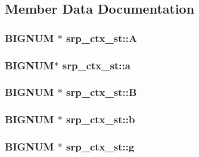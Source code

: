\subsection{Member Data Documentation}
\hypertarget{structsrp__ctx__st_a65bcccab6ee5eb609c2304fd3a2a7c3f}{
\subsubsection[{A}]{\setlength{\rightskip}{0pt plus 5cm}B\-I\-G\-N\-U\-M $\ast$ srp\-\_\-ctx\-\_\-st\-::\-A}}\label{structsrp__ctx__st_a65bcccab6ee5eb609c2304fd3a2a7c3f}
\hypertarget{structsrp__ctx__st_a5d063ec2dc87cc7351ced5b25de67e3f}{
\subsubsection[{a}]{\setlength{\rightskip}{0pt plus 5cm}B\-I\-G\-N\-U\-M$\ast$ srp\-\_\-ctx\-\_\-st\-::a}}\label{structsrp__ctx__st_a5d063ec2dc87cc7351ced5b25de67e3f}
\hypertarget{structsrp__ctx__st_a7849b7e0d38bddd6243e44f90bc8a48d}{
\subsubsection[{B}]{\setlength{\rightskip}{0pt plus 5cm}B\-I\-G\-N\-U\-M $\ast$ srp\-\_\-ctx\-\_\-st\-::\-B}}\label{structsrp__ctx__st_a7849b7e0d38bddd6243e44f90bc8a48d}
\hypertarget{structsrp__ctx__st_aee9feaedd4dd38b5532c35c3b8b366d5}{
\subsubsection[{b}]{\setlength{\rightskip}{0pt plus 5cm}B\-I\-G\-N\-U\-M $\ast$ srp\-\_\-ctx\-\_\-st\-::b}}\label{structsrp__ctx__st_aee9feaedd4dd38b5532c35c3b8b366d5}
\hypertarget{structsrp__ctx__st_a92c5d7f90a3fca1bbb24d6046ad69aa6}{
\subsubsection[{g}]{\setlength{\rightskip}{0pt plus 5cm}B\-I\-G\-N\-U\-M $\ast$ srp\-\_\-ctx\-\_\-st\-::g}}\label{structsrp__ctx__st_a92c5d7f90a3fca1bbb24d6046ad69aa6}

